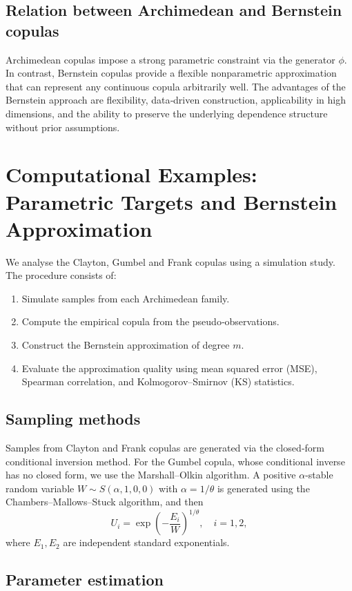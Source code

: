 \subsection{Relation between Archimedean and Bernstein copulas}

Archimedean copulas impose a strong parametric constraint via the generator \(\phi\). In contrast, Bernstein copulas provide a flexible nonparametric approximation that can represent any continuous copula arbitrarily well. The advantages of the Bernstein approach are flexibility, data‑driven construction, applicability in high dimensions, and the ability to preserve the underlying dependence structure without prior assumptions.

\section{Computational Examples: Parametric Targets and Bernstein Approximation}

We analyse the Clayton, Gumbel and Frank copulas using a simulation study. The procedure consists of:
\begin{enumerate}
\item Simulate samples from each Archimedean family.
\item Compute the empirical copula from the pseudo‑observations.
\item Construct the Bernstein approximation of degree \(m\).
\item Evaluate the approximation quality using mean squared error (MSE), Spearman correlation, and Kolmogorov–Smirnov (KS) statistics.
\end{enumerate}

\subsection{Sampling methods}

Samples from Clayton and Frank copulas are generated via the closed‑form conditional inversion method. For the Gumbel copula, whose conditional inverse has no closed form, we use the Marshall–Olkin algorithm. A positive \(\alpha\)-stable random variable \(W\sim S(\alpha,1,0,0)\) with \(\alpha=1/\theta\) is generated using the Chambers–Mallows–Stuck algorithm, and then
\[
U_i = \exp\!\left(-\frac{E_i}{W}\right)^{1/\theta},\quad i=1,2,
\]
where \(E_1,E_2\) are independent standard exponentials.

\subsection{Parameter estimation}


